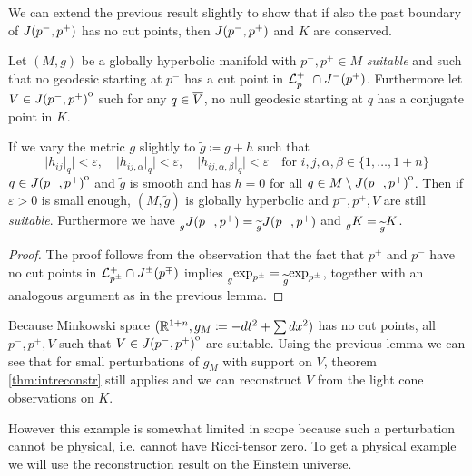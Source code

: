We can extend the previous result slightly to show that if also the past boundary of $J(p^-,p^+)$ has no cut points, then $J(p^-,p^+)$ and $K$ are conserved.
\begin{corollary}\label{cor:suitablestable}
    Let $(M,g)$ be a globally hyperbolic manifold with $p^-,p^+\in M$ \emph{suitable} and such that no geodesic starting at $p^-$ has a cut point in ${\mathcal{L}}^+_{p^-}\cap J^-(p^+)$. Furthermore let $V\in {\kern0ptJ(p^-,p^+)}^{\mathrm{o}}$ such for any $q\in {\overline{V}}$, no null geodesic starting at $q$ has a conjugate point in $K$.
    
    If we vary the metric $g$ slightly to $\widetilde{g}\coloneqq g+h$ such that 
    \[
        \lvert h_{ij}\rvert_q \rvert <\varepsilon, \quad \lvert h_{ij,\alpha}\rvert_q \rvert <\varepsilon, \quad \lvert h_{ij,\alpha,\beta}\rvert_q \rvert <\varepsilon \quad \text{for } i,j,\alpha,\beta\in \{1,\dots, 1+n\}
    \] $q\in {\kern0ptJ(p^-,p^+)}^{\mathrm{o}}$
    and $\widetilde{g}$ is smooth and has $h=0$ for all $q\in M\setminus {\kern0ptJ(p^-,p^+)}^{\mathrm{o}}$. Then if $\varepsilon>0$ is small enough, $(M,\widetilde{g})$ is globally hyperbolic and $p^-,p^+,V$ are still \emph{suitable}. Furthermore we have $\prescript{}{g}{J(p^-,p^+)}=\prescript{}{\widetilde{g}}{J(p^-,p^+)}$ and $\prescript{}{g}{K}=\prescript{}{\widetilde{g}}{K}$.
\end{corollary}
\begin{proof}
    The proof follows from the observation that the fact that $p^+$ and $p^-$ have no cut points in ${\mathcal{L}}^\mp_{p^\pm} \cap J^\pm(p^\mp)$ implies $\prescript{}{g}{\exp_{p^\pm}}= \prescript{}{\widetilde{g}}{\exp_{p^\pm}}$, together with an analogous argument as in the previous lemma.
\end{proof}

\begin{example}
    Because Minkowski space $(\mathbb{R}^{1+n}, g_M\coloneqq -dt^2 + \sum dx^2)$ has no cut points, all $p^-,p^+,V$ such that $V\in {\kern0ptJ(p^-,p^+)}^{\mathrm{o}}$ are suitable. Using the previous lemma we can see that for small perturbations of $g_M$ with support on $V$, theorem \ref{thm:intreconstr} still applies and we can reconstruct $V$ from the light cone observations on $K$.
\end{example}



However this example is somewhat limited in scope because such a perturbation cannot be physical, i.e. cannot have Ricci-tensor zero. To get a physical example we will use the reconstruction result on the Einstein universe.


